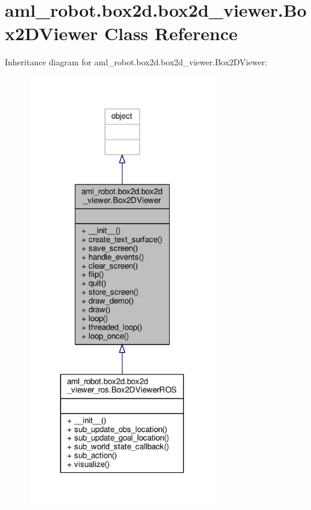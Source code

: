 \hypertarget{classaml__robot_1_1box2d_1_1box2d__viewer_1_1_box2_d_viewer}{\section{aml\-\_\-robot.\-box2d.\-box2d\-\_\-viewer.\-Box2\-D\-Viewer Class Reference}
\label{classaml__robot_1_1box2d_1_1box2d__viewer_1_1_box2_d_viewer}
}


Inheritance diagram for aml\-\_\-robot.\-box2d.\-box2d\-\_\-viewer.\-Box2\-D\-Viewer\-:\nopagebreak
\begin{figure}[H]
\begin{center}
\leavevmode
\includegraphics[width=234pt]{classaml__robot_1_1box2d_1_1box2d__viewer_1_1_box2_d_viewer__inherit__graph}
\end{center}
\end{figure}


